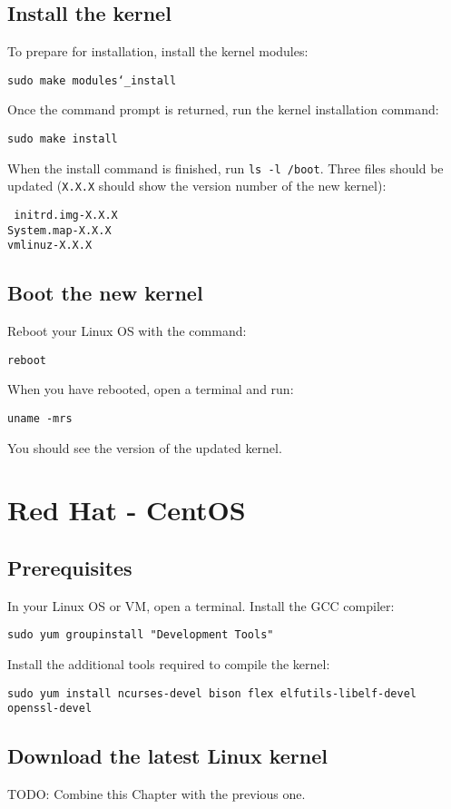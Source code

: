 \documentclass[12pt,a4paper]{report}
\begin{document}
\section{Install the kernel}
To prepare for installation, install the kernel modules:
\newline
\newline
\centerline{\texttt{sudo make modules\char`_install}}
\newline
\newline 
Once the command prompt is returned, run the kernel installation command:
\newline
\newline
\centerline{\texttt{sudo make install}}
\newline
\newline 
When the install command is finished, run \texttt{ls -l /boot}. Three files should be updated (\texttt{X.X.X} should show the version number of the new kernel):
\newline
\newline
\centerline{\texttt{
initrd.img-X.X.X
\\
System.map-X.X.X
\\
vmlinuz-X.X.X
}}
\section{Boot the new kernel}
Reboot your Linux OS with the command:
\newline
\newline
\centerline{\texttt{reboot}}
\newline
\newline 
When you have rebooted, open a terminal and run:
\newline
\newline
\centerline{\texttt{uname -mrs}}
\newline
\newline 
You should see the version of the updated kernel.

\chapter{Red Hat - CentOS}

\section{Prerequisites}
In your Linux OS or VM, open a terminal. Install the GCC compiler:
\newline
\newline
\centerline{\texttt{sudo yum groupinstall "Development Tools"}}
\newline
\newline 
Install the additional tools required to compile the kernel:
\newline
\newline
\centerline{\texttt{\scriptsize sudo yum install ncurses-devel bison flex elfutils-libelf-devel openssl-devel}}


\section{Download the latest Linux kernel}
TODO: Combine this Chapter with the previous one.
\end{document}
